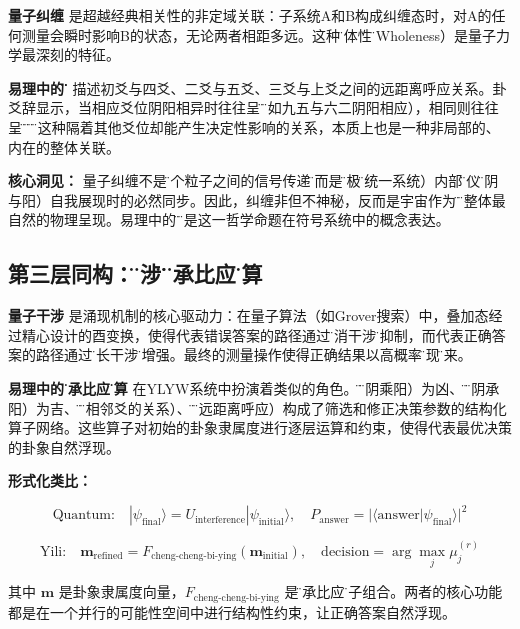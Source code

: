 \documentclass[twocolumn]{article}
\begin{document}
\textbf{量子纠缠} 是超越经典相关性的非定域关联：子系统A和B构成纠缠态时，对A的任何测量会瞬时影响B的状态，无论两者相距多远。这种\"整体性\"（Wholeness）是量子力学最深刻的特征\cite{bohr1949}。

\textbf{易理中的\"应\"} 描述初爻与四爻、二爻与五爻、三爻与上爻之间的远距离呼应关系。卦爻辞显示，当相应爻位阴阳相异时往往呈\"吉\"（如九五与六二阴阳相应），相同则往往呈\"吝\"或\"凶\"。这种隔着其他爻位却能产生决定性影响的关系，本质上也是一种非局部的、内在的整体关联。

\textbf{核心洞见：} 量子纠缠不是\"两个粒子之间的信号传递\"，而是\"太极\"（统一系统）内部\"两仪\"（阴与阳）自我展现时的必然同步。因此，纠缠非但不神秘，反而是宇宙作为\"道\"之整体最自然的物理呈现。易理中的\"应\"正是这一哲学命题在符号系统中的概念表达。

\subsection{第三层同构：\"干涉\"与\"乘承比应\"运算}

\textbf{量子干涉} 是涌现机制的核心驱动力：在量子算法（如Grover搜索\cite{grover1996}）中，叠加态经过精心设计的酉变换，使得代表错误答案的路径通过\"相消干涉\"被抑制，而代表正确答案的路径通过\"相长干涉\"被增强。最终的测量操作使得正确结果以高概率\"涌现\"出来。

\textbf{易理中的\"乘承比应\"运算} 在YLYW系统中扮演着类似的角色。\"乘\"（阴乘阳）为凶、\"承\"（阴承阳）为吉、\"比\"（相邻爻的关系）、\"应\"（远距离呼应）构成了筛选和修正决策参数的结构化算子网络。这些算子对初始的卦象隶属度进行逐层运算和约束，使得代表最优决策的卦象自然浮现。

\textbf{形式化类比：}

\begin{equation}
    \text{Quantum:} \quad |\psi_{\text{final}}\rangle = U_{\text{interference}} |\psi_{\text{initial}}\rangle, \quad P_{\text{answer}} = |\langle \text{answer}|\psi_{\text{final}}\rangle|^2
\end{equation}

\begin{equation}
    \text{Yili:} \quad  \mathbf{m}_{\text{refined}} = F_{\text{cheng-cheng-bi-ying}}(\mathbf{m}_{\text{initial}}), \quad \text{decision} = \arg\max_j \mu_j^{(r)}
\end{equation}

其中 $\mathbf{m}$ 是卦象隶属度向量，$F_{\text{cheng-cheng-bi-ying}}$ 是\"乘承比应\"算子组合。两者的核心功能都是在一个并行的可能性空间中进行结构性约束，让正确答案自然浮现。
\end{document}
